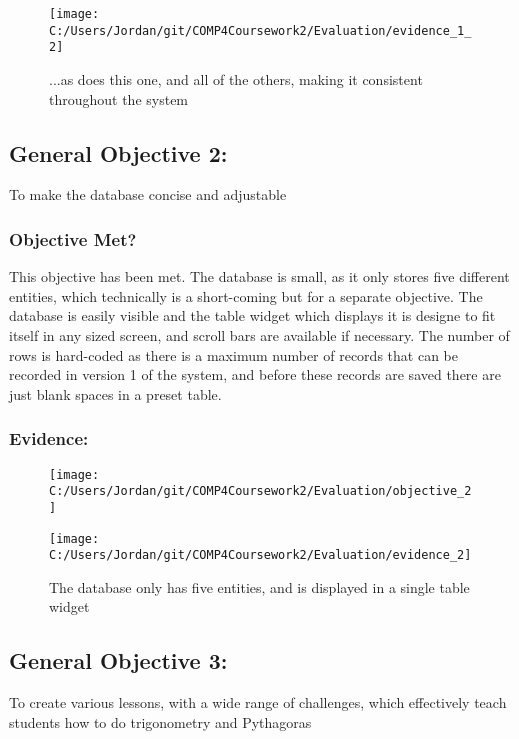 \begin{figure}[H]
	\texttt{[image: C:/Users/Jordan/git/COMP4Coursework2/Evaluation/evidence\_1\_2]}
	\caption{...as does this one, and all of the others, making it consistent throughout the system} 
\end{figure}

\subsection{General Objective 2: }

To make the database concise and adjustable

\subsubsection{Objective Met?}

This objective has been met. The database is small, as it only stores five different entities, which technically is a short-coming but for a separate objective. The database is easily visible and the table widget which displays it is designe to fit itself in any sized screen, and scroll bars are available if necessary. The number of rows is hard-coded as there is a maximum number of records that can be recorded in version 1 of the system, and before these records are saved there are just blank spaces in a preset table.

\subsubsection{Evidence: }

\begin{figure}[H]
	\texttt{[image: C:/Users/Jordan/git/COMP4Coursework2/Evaluation/objective\_2]}
\end{figure}

\begin{figure}[H]
	\texttt{[image: C:/Users/Jordan/git/COMP4Coursework2/Evaluation/evidence\_2]}
	\caption{The database only has five entities, and is displayed in a single table widget}
\end{figure}

\subsection{General Objective 3: }

To create various lessons, with a wide range of challenges, which effectively teach students how to do trigonometry and Pythagoras

